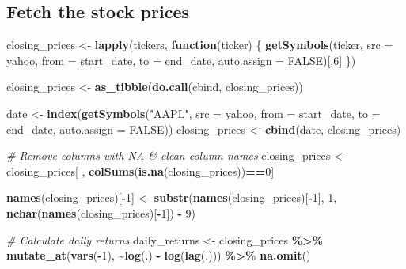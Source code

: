 \documentclass[
]{article}
\newenvironment{Shaded}{\begin{snugshade}}{\end{snugshade}}
\newcommand{\AttributeTok}[1]{\textcolor[rgb]{0.13,0.29,0.53}{#1}}
\newcommand{\CommentTok}[1]{\textcolor[rgb]{0.56,0.35,0.01}{\textit{#1}}}
\newcommand{\ConstantTok}[1]{\textcolor[rgb]{0.56,0.35,0.01}{#1}}
\newcommand{\ControlFlowTok}[1]{\textcolor[rgb]{0.13,0.29,0.53}{\textbf{#1}}}
\newcommand{\DecValTok}[1]{\textcolor[rgb]{0.00,0.00,0.81}{#1}}
\newcommand{\FunctionTok}[1]{\textcolor[rgb]{0.13,0.29,0.53}{\textbf{#1}}}
\newcommand{\NormalTok}[1]{#1}
\newcommand{\OtherTok}[1]{\textcolor[rgb]{0.56,0.35,0.01}{#1}}
\newcommand{\SpecialCharTok}[1]{\textcolor[rgb]{0.81,0.36,0.00}{\textbf{#1}}}
\newcommand{\StringTok}[1]{\textcolor[rgb]{0.31,0.60,0.02}{#1}}
\begin{document}
\hypertarget{fetch-the-stock-prices}{%
\subsection{Fetch the stock prices}\label{fetch-the-stock-prices}}

\begin{Shaded}
\begin{Highlighting}[]
\NormalTok{closing\_prices }\OtherTok{\textless{}{-}} \FunctionTok{lapply}\NormalTok{(tickers, }\ControlFlowTok{function}\NormalTok{(ticker) \{}
  \FunctionTok{getSymbols}\NormalTok{(ticker, }\AttributeTok{src =} \StringTok{\textquotesingle{}yahoo\textquotesingle{}}\NormalTok{, }\AttributeTok{from =}\NormalTok{ start\_date, }\AttributeTok{to =}\NormalTok{ end\_date, }\AttributeTok{auto.assign =} \ConstantTok{FALSE}\NormalTok{)[,}\DecValTok{6}\NormalTok{]}
\NormalTok{\})}

\NormalTok{closing\_prices }\OtherTok{\textless{}{-}} \FunctionTok{as\_tibble}\NormalTok{(}\FunctionTok{do.call}\NormalTok{(cbind, closing\_prices))}

\NormalTok{date }\OtherTok{\textless{}{-}} \FunctionTok{index}\NormalTok{(}\FunctionTok{getSymbols}\NormalTok{(}\StringTok{"AAPL"}\NormalTok{, }\AttributeTok{src =} \StringTok{\textquotesingle{}yahoo\textquotesingle{}}\NormalTok{, }\AttributeTok{from =}\NormalTok{ start\_date, }\AttributeTok{to =}\NormalTok{ end\_date, }\AttributeTok{auto.assign =} \ConstantTok{FALSE}\NormalTok{))}
\NormalTok{closing\_prices }\OtherTok{\textless{}{-}} \FunctionTok{cbind}\NormalTok{(date, closing\_prices)}

\CommentTok{\# Remove columns with NA \& clean column names}
\NormalTok{closing\_prices }\OtherTok{\textless{}{-}}\NormalTok{ closing\_prices[ , }\FunctionTok{colSums}\NormalTok{(}\FunctionTok{is.na}\NormalTok{(closing\_prices))}\SpecialCharTok{==}\DecValTok{0}\NormalTok{]}

\FunctionTok{names}\NormalTok{(closing\_prices)[}\SpecialCharTok{{-}}\DecValTok{1}\NormalTok{] }\OtherTok{\textless{}{-}} \FunctionTok{substr}\NormalTok{(}\FunctionTok{names}\NormalTok{(closing\_prices)[}\SpecialCharTok{{-}}\DecValTok{1}\NormalTok{], }\DecValTok{1}\NormalTok{, }\FunctionTok{nchar}\NormalTok{(}\FunctionTok{names}\NormalTok{(closing\_prices)[}\SpecialCharTok{{-}}\DecValTok{1}\NormalTok{]) }\SpecialCharTok{{-}} \DecValTok{9}\NormalTok{)}

\CommentTok{\# Calculate daily returns}
\NormalTok{daily\_returns }\OtherTok{\textless{}{-}}\NormalTok{ closing\_prices }\SpecialCharTok{\%\textgreater{}\%}
  \FunctionTok{mutate\_at}\NormalTok{(}\FunctionTok{vars}\NormalTok{(}\SpecialCharTok{{-}}\DecValTok{1}\NormalTok{), }\SpecialCharTok{\textasciitilde{}}\FunctionTok{log}\NormalTok{(.) }\SpecialCharTok{{-}} \FunctionTok{log}\NormalTok{(}\FunctionTok{lag}\NormalTok{(.))) }\SpecialCharTok{\%\textgreater{}\%}
  \FunctionTok{na.omit}\NormalTok{()}


\end{Highlighting}
\end{Shaded}
\end{document}

